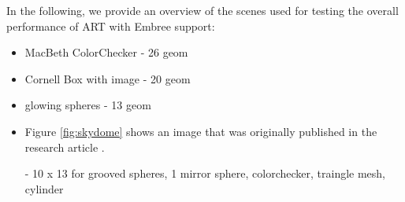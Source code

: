 \noindent In the following, we provide an overview of the scenes used for testing the overall performance of ART with Embree support:
\begin{itemize}
	\setlength\itemsep{0.05em}
	
	\item MacBeth ColorChecker - 26 geom
	
	\item Cornell Box with image - 20 geom
	
	\item glowing spheres - 13 geom
	
	\item Figure \ref{fig:skydome} shows an image that was originally published in the research article  \cite{wilkie2013predicting}.
	
	- 10 x 13 for grooved spheres, 1 mirror sphere, colorchecker, traingle mesh, cylinder
	
	
\end{itemize}


